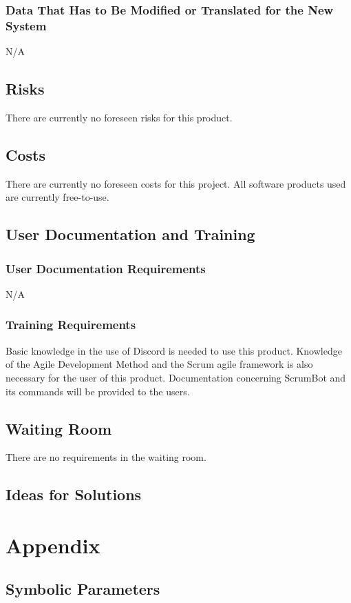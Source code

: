 \documentclass[12pt, titlepage]{article}
\begin{document}
\subsubsection{Data That Has to Be Modified or Translated for the New System}
N/A

\subsection{Risks}
There are currently no foreseen risks for this product.

\subsection{Costs}
There are currently no foreseen costs for this project. All software products used are currently free-to-use.

\subsection{User Documentation and Training}
\subsubsection{User Documentation Requirements}
N/A

\subsubsection{Training Requirements}
Basic knowledge in the use of Discord is needed to use this product. Knowledge of the Agile Development Method and the Scrum agile framework is also necessary for the user of this product. Documentation concerning ScrumBot and its commands will be provided to the users.

\subsection{Waiting Room}
There are no requirements in the waiting room.

\subsection{Ideas for Solutions}





\newpage

\section{Appendix}

\subsection{Symbolic Parameters}
\end{document}

